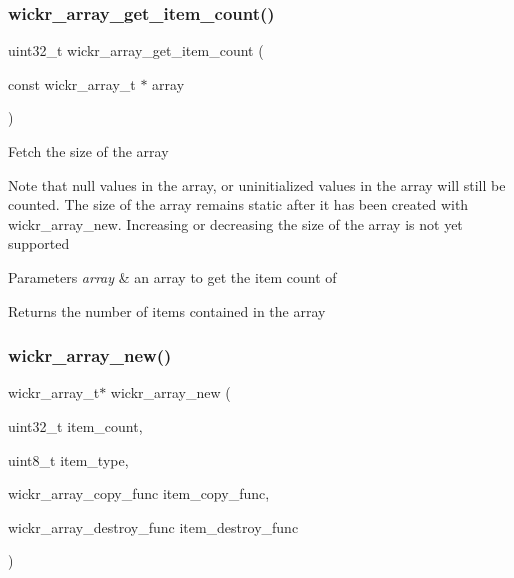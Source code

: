 \subsubsection{\texorpdfstring{wickr\+\_\+array\+\_\+get\+\_\+item\+\_\+count()}{wickr\_array\_get\_item\_count()}}
{\footnotesize\ttfamily uint32\+\_\+t wickr\+\_\+array\+\_\+get\+\_\+item\+\_\+count (\begin{DoxyParamCaption}\item[{const wickr\+\_\+array\+\_\+t $\ast$}]{array }\end{DoxyParamCaption})}

Fetch the size of the array

Note that null values in the array, or uninitialized values in the array will still be counted. The size of the array remains static after it has been created with wickr\+\_\+array\+\_\+new. Increasing or decreasing the size of the array is not yet supported


\begin{DoxyParams}{Parameters}
{\em array} & an array to get the item count of \\
\hline
\end{DoxyParams}
\begin{DoxyReturn}{Returns}
the number of items contained in the array 
\end{DoxyReturn}
\mbox{\label{group__wickr__array_gad5842105c20b42cc4b5b4ffc2a72556b}} 
\subsubsection{\texorpdfstring{wickr\+\_\+array\+\_\+new()}{wickr\_array\_new()}}
{\footnotesize\ttfamily wickr\+\_\+array\+\_\+t$\ast$ wickr\+\_\+array\+\_\+new (\begin{DoxyParamCaption}\item[{uint32\+\_\+t}]{item\+\_\+count,  }\item[{uint8\+\_\+t}]{item\+\_\+type,  }\item[{wickr\+\_\+array\+\_\+copy\+\_\+func}]{item\+\_\+copy\+\_\+func,  }\item[{wickr\+\_\+array\+\_\+destroy\+\_\+func}]{item\+\_\+destroy\+\_\+func }\end{DoxyParamCaption})}

